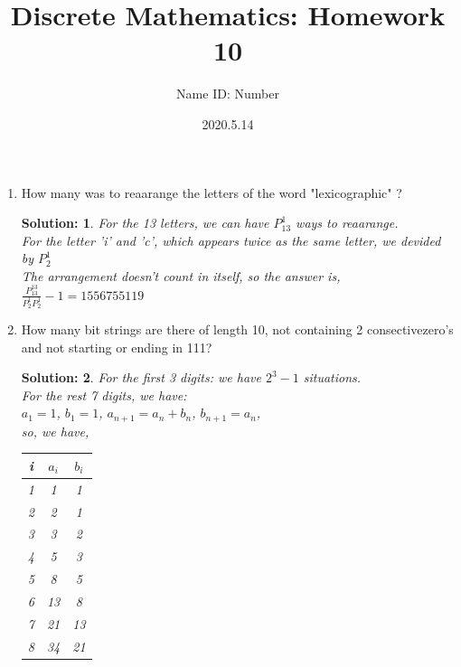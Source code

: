 \documentclass{article}
\title{Discrete Mathematics:  Homework 10}
\author{Name  \quad  \quad ID: Number}
\date{2020.5.14}
\theoremstyle{break}
\newtheorem*{solution*}{\textbf{Solution:} }
\begin{document}
\maketitle
\begin{enumerate}
\item How many was to reaarange the letters of the word  "lexicographic" ?
\begin{solution*}
For the 13 letters, we can have $P_{13}^{1}$ ways to reaarange.\\
For the letter 'i' and 'c', which appears twice as the same letter, we devided by $P_{2}^{1}$  \\
The arrangement doesn't count in itself, so the answer is, \\
$ \frac  {P_{13}^{13} }{P_{2}^{1} P_{2}^{1}} -1 = 1556755119$
\end{solution*}
 \vspace{10mm}
\item How many bit strings are there of length 10, not containing 2 consectivezero's and not starting or ending in 111?
\begin{solution*}
        For the first 3 digits: we have $2^3-1$ situations.\\
        For the rest 7 digits, we have:\\
        $a_1= 1$, $b_1 = 1$, $a_{n+1} = a_n + b_n$, $b_{n+1} = a_n$,\\
        so, we have,\\
        \begin{center}
                \begin{tabular}{|c|c|c|}
                        \hline
                        i & $a_i$ & $b_i$\\
                        \hline
                        1 & 1 & 1 \\
                        \hline
                        2 & 2 & 1 \\
                        \hline
                        3 & 3 & 2 \\
                        \hline
                        4 & 5 & 3 \\
                        \hline
                        5 & 8 & 5 \\
                        \hline
                        6 & 13 & 8 \\
                        \hline 
                        7 & 21 & 13 \\
                        \hline 
                        8 & 34 & 21 \\

\end{tabular}
\end{center}
\end{solution*}
\end{enumerate}
\end{document}
